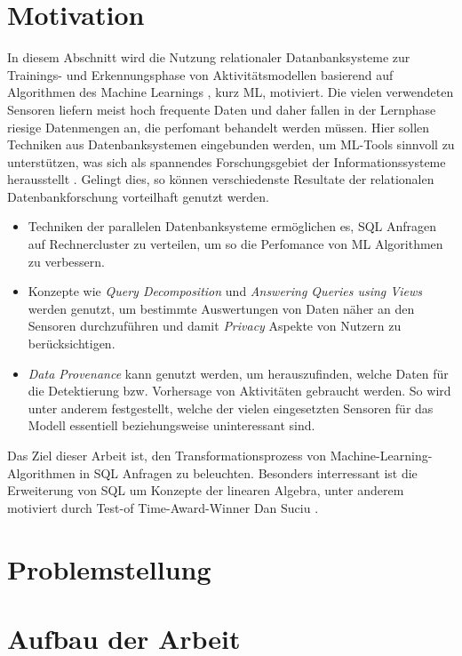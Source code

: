 \section*{Motivation}

In diesem Abschnitt wird die Nutzung relationaler Datanbanksysteme zur Trainings- und Erkennungsphase von Aktivitätsmodellen 
basierend auf Algorithmen des Machine Learnings \cite{anzai2012pattern}, kurz ML, motiviert.
Die vielen verwendeten Sensoren liefern meist hoch frequente Daten und daher fallen in der Lernphase riesige Datenmengen an, die perfomant behandelt werden müssen.
Hier sollen Techniken aus Datenbanksystemen eingebunden werden, um ML-Tools sinnvoll zu unterstützen, was sich als spannendes Forschungsgebiet der Informationssysteme herausstellt \cite{abiteboul2018research}.
Gelingt dies, so können verschiedenste Resultate der relationalen Datenbankforschung vorteilhaft genutzt werden.
\begin{itemize}
    \item Techniken der parallelen Datenbanksysteme ermöglichen es, SQL Anfragen auf Rechnercluster zu verteilen, um so die Perfomance von ML Algorithmen zu verbessern.
    \item Konzepte wie \textit{Query Decomposition} \cite{chirkova2011materialized} und \textit{Answering Queries using Views} \cite{ afrati2019answering, levy1999answering} werden genutzt, um bestimmte Auswertungen von Daten näher an den Sensoren durchzuführen und damit \textit{Privacy} \cite{agrawal2000privacy} Aspekte von Nutzern zu berücksichtigen.
    \item \textit{Data Provenance} \cite{heuer2015metis, bruder2017konzepte} kann genutzt werden, um herauszufinden, welche Daten für die Detektierung bzw. Vorhersage von Aktivitäten gebraucht werden. 
    So wird unter anderem festgestellt, welche der vielen eingesetzten Sensoren für das Modell essentiell beziehungsweise uninteressant sind.
\end{itemize} 
Das Ziel dieser Arbeit ist, den Transformationsprozess von Machine-Learning-Algorithmen in SQL Anfragen zu beleuchten. Besonders interressant ist die Erweiterung von SQL um Konzepte der linearen Algebra, unter anderem motiviert durch Test-of Time-Award-Winner Dan Suciu \cite{interviewsuciu} .


\section*{Problemstellung}

\section*{Aufbau der Arbeit}
\begin{verbatim}\end{verbatim}

